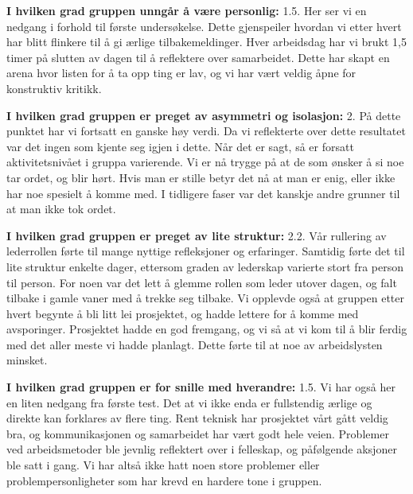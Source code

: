 \noindent \textbf{I hvilken grad gruppen unngår å være personlig:} 1.5.
\newline
\noindent Her ser vi en nedgang i forhold til første undersøkelse. Dette gjenspeiler hvordan vi etter hvert har blitt flinkere til å gi ærlige tilbakemeldinger. Hver arbeidsdag har vi brukt 1,5 timer på slutten av dagen til å reflektere over samarbeidet. 
Dette har skapt en arena hvor listen for å ta opp ting er lav, og vi har vært veldig åpne for konstruktiv kritikk.
\vspace{\secspace}

\noindent \textbf{I hvilken grad gruppen er preget av asymmetri og isolasjon:} 2.
\newline
\noindent På dette punktet har vi fortsatt en ganske høy verdi. 
Da vi reflekterte over dette resultatet var det ingen som kjente seg igjen i dette. Når det er sagt, så er forsatt aktivitetsnivået i gruppa varierende.
Vi er nå trygge på at de som ønsker å si noe tar ordet, og blir hørt. 
Hvis man er stille betyr det nå at man er enig, eller ikke har noe spesielt å komme med. 
I tidligere faser var det kanskje andre grunner til at man ikke tok ordet. 

\vspace{\secspace}

\noindent \textbf{I hvilken grad gruppen er preget av lite struktur:} 2.2.
\newline
\noindent Vår rullering av lederrollen førte til mange nyttige refleksjoner og erfaringer. 
Samtidig førte det til lite struktur enkelte dager, ettersom graden av lederskap varierte stort fra person til person. For noen var det lett å glemme rollen som leder utover dagen, og falt tilbake i gamle vaner med å trekke seg tilbake. 
Vi opplevde også at gruppen etter hvert begynte å bli litt lei prosjektet, og hadde lettere for å komme med avsporinger.
Prosjektet hadde en god fremgang, og vi så at vi kom til å blir ferdig med det aller meste vi hadde planlagt.
Dette førte til at noe av arbeidslysten minsket.
\vspace{\secspace}

\noindent \textbf{I hvilken grad gruppen er for snille med hverandre:} 1.5.
\newline
\noindent Vi har også her en liten nedgang fra første test. Det at vi ikke enda er fullstendig ærlige og direkte kan forklares av flere ting. 
Rent teknisk har prosjektet vårt gått veldig bra, og kommunikasjonen og samarbeidet har vært godt hele veien. Problemer ved arbeidsmetoder ble jevnlig reflektert over i felleskap, og påfølgende aksjoner ble satt i gang. Vi har altså ikke hatt noen store problemer eller problempersonligheter som har krevd en hardere tone i gruppen. 
\vspace{\secspace}


